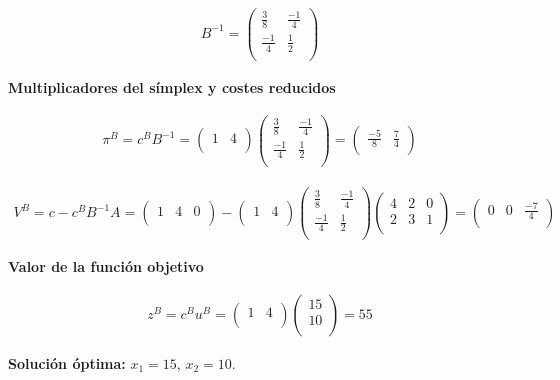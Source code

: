 \begin{equation}
\begin{split}
B^{-1} =\begin{pmatrix}
\frac{3}{8} & \frac{-1}{4}\\
\frac{-1}{4} & \frac{1}{2}\\
\end{pmatrix}
\end{split}
\end{equation}

\textbf{Multiplicadores del símplex y costes reducidos}

\begin{equation}
\begin{split}
\pi^B = c^BB^{-1} = \begin{pmatrix}
1 & 4\\
\end{pmatrix}
\begin{pmatrix}
\frac{3}{8} & \frac{-1}{4}\\
\frac{-1}{4} & \frac{1}{2}\\
\end{pmatrix}
 = \begin{pmatrix}
\frac{-5}{8} & \frac{7}{4}\\
\end{pmatrix}
\end{split}
\end{equation}

\begin{equation}
\begin{split}
V^B = c-c^BB^{-1}A = \begin{pmatrix}
1 & 4 & 0\\
\end{pmatrix}
 - \begin{pmatrix}
1 & 4\\
\end{pmatrix}
\begin{pmatrix}
\frac{3}{8} & \frac{-1}{4}\\
\frac{-1}{4} & \frac{1}{2}\\
\end{pmatrix}
\begin{pmatrix}
4 & 2 & 0\\
2 & 3 & 1\\
\end{pmatrix}
 = \begin{pmatrix}
0 & 0 & \frac{-7}{4}\\
\end{pmatrix}
\end{split}
\end{equation}

\textbf{Valor de la función objetivo}

\begin{equation}
\begin{split}
z^B=c^Bu^B = \begin{pmatrix}
1 & 4\\
\end{pmatrix}
\begin{pmatrix}
15\\
10\\
\end{pmatrix}
 = 55
\end{split}
\end{equation}

\textbf{Solución óptima:} $x_1 = 15$, $x_2 = 10$.

